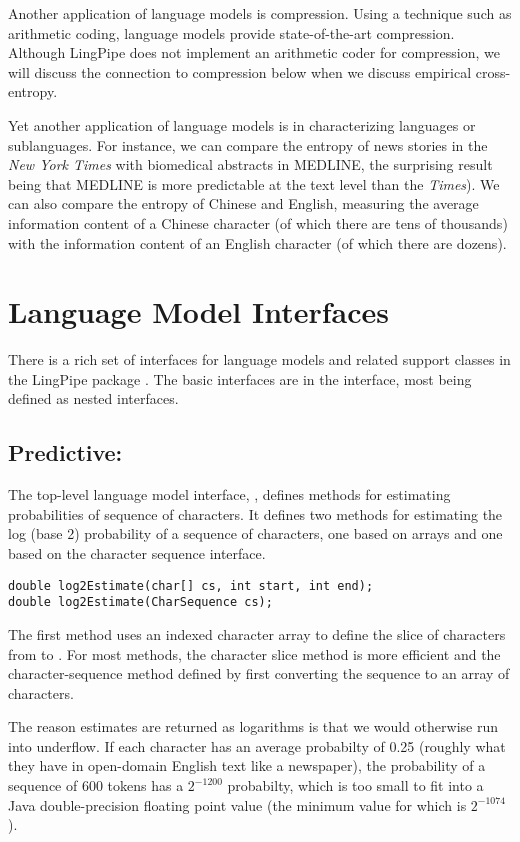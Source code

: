 Another application of language models is compression.  Using a
technique such as arithmetic coding, language models provide
state-of-the-art compression.  Although LingPipe does not implement an
arithmetic coder for compression, we will discuss the connection to
compression below when we discuss empirical cross-entropy.

Yet another application of language models is in characterizing
languages or sublanguages.  For instance, we can compare the entropy
of news stories in the {\it New York Times} with biomedical abstracts
in MEDLINE, the surprising result being that MEDLINE is more
predictable at the text level than the {\it Times}).  We can also
compare the entropy of Chinese and English, measuring the average
information content of a Chinese character (of which there are tens of
thousands) with the information content of an English character (of
which there are dozens).

\section{Language Model Interfaces}\label{section:char-lm-interfaces}

There is a rich set of interfaces for language models and related
support classes in the LingPipe package .  The
basic interfaces are in the  interface, most
being defined as nested interfaces.

\subsection{Predictive: }

The top-level language model interface, , defines
methods for estimating probabilities of sequence of characters.  It
defines two methods for estimating the log (base 2) probability of a
sequence of characters, one based on arrays and one based on the
character sequence interface.
%
\begin{verbatim}
double log2Estimate(char[] cs, int start, int end);
double log2Estimate(CharSequence cs);
\end{verbatim}
%
The first method uses an indexed character array to define the slice
of characters from  to .  For most
methods, the character slice method is more efficient and the
character-sequence method defined by first converting the sequence to
an array of characters.

The reason estimates are returned as logarithms is that we would
otherwise run into underflow.  If each character has an average
probabilty of 0.25 (roughly what they have in open-domain English text
like a newspaper), the probability of a sequence of 600 tokens has a
$2^{-1200}$ probabilty, which is too small to fit into a Java
double-precision floating point value (the minimum value for which is
$2^{-1074}$).

